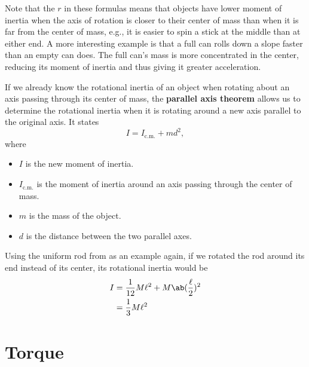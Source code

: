 Note that the \(r\) in these formulas means that objects have lower
moment of inertia
when the axis of rotation is closer to their center of mass
than when it is far from the center of mass,
e.g., it is easier to spin a stick at the middle than at either end.
A more interesting example is that a full can rolls down a slope
faster than an empty can does.
The full can's mass is more concentrated in the center,
reducing its moment of inertia and thus giving it greater acceleration.

If we already know the rotational inertia of an object
when rotating about an axis passing through its center of mass,
the \textbf{parallel axis theorem} allows us to determine the rotational inertia
when it is rotating around a new axis parallel to the original axis.
It states
\begin{equation}
    I = I_\mathrm{c.m.} + m d^2,
\end{equation}
where
\begin{itemize}
    \item \(I\) is the new moment of inertia.
    \item \(I_\mathrm{c.m.}\) is the moment of inertia
        around an axis passing through the center of mass.
    \item \(m\) is the mass of the object.
    \item \(d\) is the distance between the two parallel axes.
\end{itemize}

Using the uniform rod from 
as an example again,
if we rotated the rod around its end instead of its center, its
rotational inertia would be
\begin{equation}
    \begin{aligned}
        I &= \frac{1}{12} M \ell^2 + M \ab( \frac{\ell}{2} )^2 \\
        &= \frac{1}{3} M \ell^2
    \end{aligned}
\end{equation}

\begin{figure}[ht]
    \centering
    
\end{figure}

\section{Torque}

